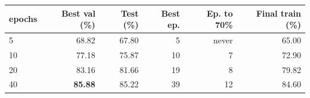 \begin{tabular}{lrrrrr}
\toprule
epochs & Best val (\%) & Test (\%) & Best ep. & Ep. to 70\% & Final train (\%) \\
\midrule
5 & 68.82 & 67.80 & 5 & never & 65.00 \\
10 & 77.18 & 75.87 & 10 & 7 & 72.90 \\
20 & 83.16 & 81.66 & 19 & 8 & 79.82 \\
40 & \textbf{85.88} & 85.22 & 39 & 12 & 84.60 \\
\bottomrule
\end{tabular}
